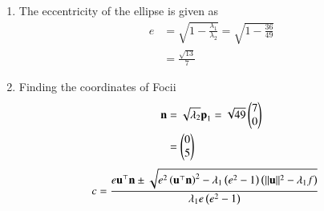 \documentclass[journal,12pt,twocolumn]{IEEEtran}
\renewcommand{\vec}[1]{\boldsymbol{\mathbf{#1}}}
\begin{document}
\begin{enumerate}
\item The eccentricity of the ellipse is given as
\begin{align}
	e &= \sqrt{1 - \frac{\lambda_1}{\lambda_2}} = \sqrt{1-\frac{36}{49}}\\
	  &= \frac{\sqrt{13}}{7}
\end{align}
\item Finding the coordinates of Focii
\begin{align}
	\vec{n} &= \sqrt{\lambda_2}\vec{p}_1= \sqrt{49} \myvec{7\\0}\\
	&= \myvec{0\\5}
\end{align}
\begin{align}
	\label{eq:4}
	c &= \frac{e\vec{u}^\top \vec{n} \pm \sqrt{e^2 \brak{\vec{u}^\top \vec{n}}^2-\lambda_1 \brak{e^2 -1}\brak{\norm{\vec{u}}^2-\lambda_1 f}}}{\lambda_1 e\brak{e^2-1}}
\end{align}


\end{enumerate}
\end{document}
